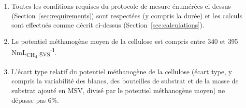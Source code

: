 \documentclass[]{article}
\begin{document}
\begin{enumerate}
  \item Toutes les conditions requises du protocole de mesure énumérées ci-dessus (Section \ref{sec:requirements}) sont respectées (y compris la durée) et les calculs sont effectués comme décrit ci-dessus (Section \ref{sec:calculations}).
  \item Le potentiel méthanogène moyen de la cellulose est compris entre 340 et 395 NmL\textsubscript{CH\textsubscript{4}} g\textsubscript{VS}\textsuperscript{-1}.
  \item L’écart type relatif du potentiel méthanogène de la cellulose (écart type, y compris la variabilité des blancs, des bouteilles de substrat et de la masse de substrat ajouté en MSV, divisé par le potentiel méthanogène moyen) ne dépasse pas 6\%.
\end{enumerate}


\end{document}
